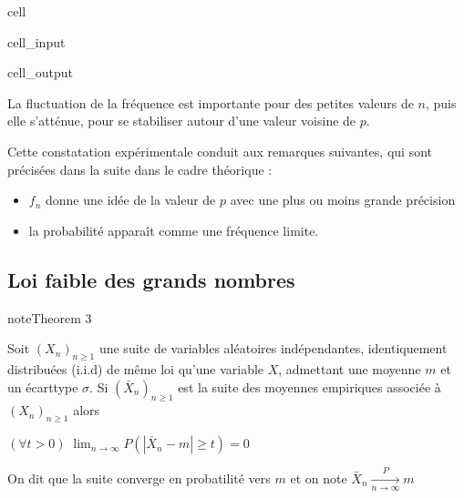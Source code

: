 \documentclass[letterpaper,10pt,english]{jupyterBook}
\begin{document}
\begin{sphinxuseclass}{cell}
\begin{sphinxVerbatimInput}
\begin{sphinxuseclass}{cell_input}
\begin{sphinxVerbatim}[commandchars=\\\{\}]
\end{sphinxVerbatim}

\end{sphinxuseclass}\end{sphinxVerbatimInput}
\begin{sphinxVerbatimOutput}

\begin{sphinxuseclass}{cell_output}
\noindent{}

\end{sphinxuseclass}\end{sphinxVerbatimOutput}

\end{sphinxuseclass}
\sphinxAtStartPar
La fluctuation de la fréquence est importante pour des petites valeurs de \(n\), puis elle s’atténue, pour se stabiliser autour d’une valeur voisine de \(p\).

\sphinxAtStartPar
Cette constatation expérimentale conduit aux remarques suivantes, qui sont précisées dans la suite dans le cadre théorique :
\begin{itemize}
\item {} 
\sphinxAtStartPar
\(f_n\) donne une idée de la valeur de \(p\) avec une plus ou moins grande précision

\item {} 
\sphinxAtStartPar
la probabilité apparaît comme une fréquence limite.

\end{itemize}


\subsection{Loi faible des grands nombres}
\label{\detokenize{elemstats:loi-faible-des-grands-nombres}}\label{elemstats:theorem-6}
\begin{sphinxadmonition}{note}{Theorem 3}



\sphinxAtStartPar
Soit \((X_n)_{n\geq 1}\) une suite de variables aléatoires indépendantes, identiquement distribuées (i.i.d) de même loi qu’une variable \(X\), admettant une moyenne \(m\) et un écart\sphinxhyphen{}type \(\sigma\). Si \((\bar{X}_n)_{n\geq 1}\) est la suite des moyennes empiriques associée à \((X_n)_{n\geq 1}\) alors

\sphinxAtStartPar
\((\forall t>0)\; \displaystyle\lim_{n\rightarrow\infty} P(|\bar{X}_n-m|\geq t) = 0\)

\sphinxAtStartPar
On dit que la suite converge en probatilité vers \(m\) et on note \(\bar{X}_n\xrightarrow[n\rightarrow\infty]{P} m\)
\end{sphinxadmonition}
\end{document}
